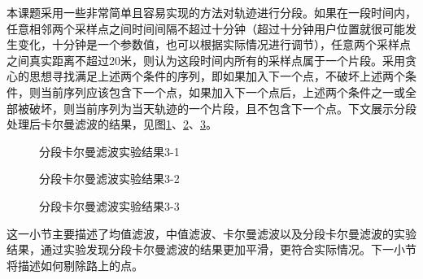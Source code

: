 \par 本课题采用一些非常简单且容易实现的方法对轨迹进行分段。如果在一段时间内，任意相邻两个采样点之间时间间隔不超过十分钟（超过十分钟用户位置就很可能发生变化，十分钟是一个参数值，也可以根据实际情况进行调节），任意两个采样点之间真实距离不超过20米，则认为这段时间内所有的采样点属于一个片段。采用贪心的思想寻找满足上述两个条件的序列，即如果加入下一个点，不破坏上述两个条件，则当前序列应该包含下一个点，如果加入下一个点后，上述两个条件之一或全部被破坏，则当前序列为当天轨迹的一个片段，且不包含下一个点。下文展示分段处理后卡尔曼滤波的结果，见图\ref{fig:3_5_1}、\ref{fig:3_5_2}、\ref{fig:3_5_3}。
\begin{figure}[htb]
  \centering%
  \hspace{4em}%
  \caption{分段卡尔曼滤波实验结果3-1}
  \label{fig:3_5_1}
\end{figure}
\begin{figure}[htb]
  \centering%
  \hspace{4em}%
  \caption{分段卡尔曼滤波实验结果3-2}
  \label{fig:3_5_2}
\end{figure}
\begin{figure}[htb]
  \centering%
  \hspace{4em}%
  \caption{分段卡尔曼滤波实验结果3-3}
  \label{fig:3_5_3}
\end{figure}
\par 这一小节主要描述了均值滤波，中值滤波、卡尔曼滤波以及分段卡尔曼滤波的实验结果，通过实验发现分段卡尔曼滤波的结果更加平滑，更符合实际情况。下一小节将描述如何剔除路上的点。
